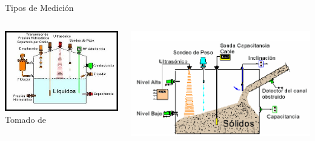 \documentclass[aspectratio=169]{beamer}
\begin{document}
\begin{frame}{Tipos de Medición}
    \begin{columns}[c, onlytextwidth]
        \begin{column}{0.45\textwidth}
        \includegraphics[width = 1\linewidth]{fig/Nivel/Nivel-de-liquidos.png}
        \tiny{Tomado de \cite{sole2005instrumentacion}}
        \end{column}
        \begin{column}{0.50\textwidth}
            \includegraphics[width = 1\linewidth]{fig/Nivel/Nivel-de-solidos.png}
        \end{column}
    \end{columns}
\end{frame}
\end{document}
